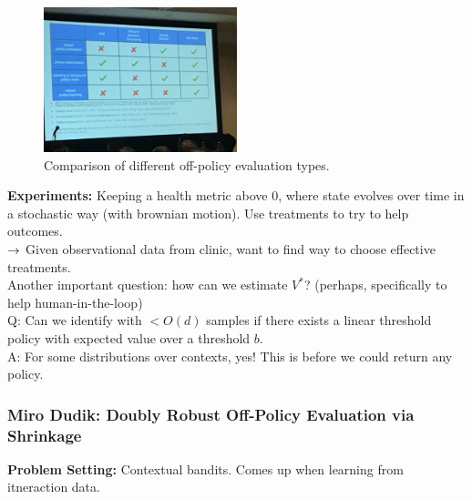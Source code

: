 \begin{figure}
    \centering
    \includegraphics[width=0.5\textwidth]{images/off_pol.JPG}
    \caption{Comparison of different off-policy evaluation types.}
    \label{fig:off_policy}
\end{figure}

{\bf Experiments:} Keeping a health metric above 0, where state evolves over time in a stochastic way (with brownian motion). Use treatments to try to help outcomes. \\

$\rightarrow$ Given observational data from clinic, want to find way to choose effective treatments. \\

Another important question: how can we estimate $V^*$? (perhaps, specifically to help human-in-the-loop)\\

Q: Can we identify with $< O (d)$ samples if there exists a linear threshold policy with expected value over a threshold $b$. \\

A: For some distributions over contexts, yes! This is before we could return any policy.

\spacerule


\subsubsection{Miro Dudik: Doubly Robust Off-Policy Evaluation via Shrinkage}

{\bf Problem Setting:} Contextual bandits. Comes up when learning from itneraction data.\\


